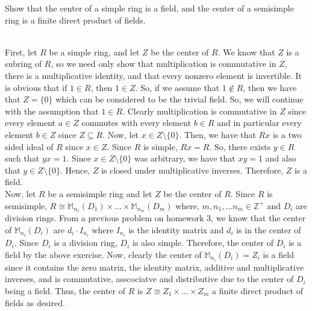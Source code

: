 Show that the center of a simple ring is a field, and the center of a semisimple ring is a finite direct
product of fields.\\

\begin{solution}\renewcommand{\qedsymbol}{}\ \\
    First, let $R$ be a simple ring, and let $Z$ be the center of $R$. We know that $Z$ is a subring of
    $R$, so we need only show that multiplication is commutative in $Z$, there is a multiplicative
    identity, and that every nonzero element is invertible. It is obvious that if $1\in R$, then
    $1\in Z$. So, if we assume that $1\notin R$, then we have that $Z=\{0\}$ which can be considered to
    be the trivial field. So, we will continue with the assumption that $1\in R$. Clearly multiplication
    is commutative in $Z$ since every element $a\in Z$ commutes with every element $b\in R$ and in
    particular every element $b\in Z$ since $Z\subseteq R$. Now, let $x\in Z\setminus\{0\}$. Then, we
    have that $Rx$ is a two sided ideal of $R$ since $x\in Z$. Since $R$ is simple, $Rx=R$. So, there
    exists $y\in R$ such that $yx=1$. Since $x\in Z\setminus\{0\}$ was arbitrary, we have that $xy=1$
    and also that $y\in Z\setminus\{0\}$. Hence, $Z$ is closed under multiplicative inverses. Therefore,
    $Z$ is a field.\\

    Now, let $R$ be a semisimple ring and let $Z$ be the center of $R$. Since $R$ is semisimple,
    $R\cong\mathbb{M}_{n_1}(D_1)\times\ldots\times\mathbb{M}_{n_m}(D_m)$ where,
    $m,n_1,\ldots n_m\in\mathbb{Z}^+$ and $D_i$ are division rings. From a previous problem on homework
    3, we know that the center of $\mathbb{M}_{n_i}(D_i)$ are $d_i\cdot I_{n_i}$ where $I_{n_i}$ is the
    identity matrix and $d_i$ is in the center of $D_i$. Since $D_i$ is a division ring, $D_i$ is also
    simple. Therefore, the center of $D_i$ is a field by the above exercise. Now, clearly the center of
    $\mathbb{M}_{n_i}(D_i)=Z_i$ is a field since it contains the zero matrix, the identity matrix,
    additive and multiplicative inverses, and is commutative, asscociatve and distributive due to the
    center of $D_i$ being a field. Thus, the center of $R$ is $Z\cong Z_1\times\ldots\times Z_m$ a
    finite direct product of fields as desired.

\end{solution}
